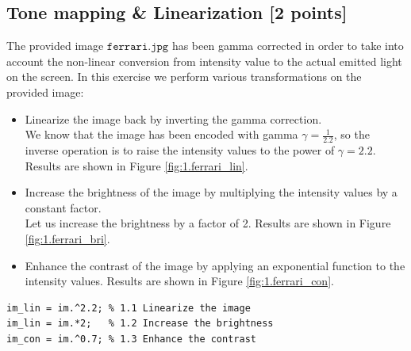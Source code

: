 \documentclass[tikz,14pt,fleqn]{article}
\begin{document}
\subsection{Tone mapping \& Linearization [2 points]}
 The provided image $\texttt{ferrari.jpg}$ has been gamma corrected in order to take into account the non-linear conversion from intensity value to the actual emitted light on the screen.
In this exercise we perform various transformations on the provided image:
 \begin{itemize}
    \item Linearize the image back by inverting the gamma correction.\\
    We know that the image has been encoded with gamma $\gamma = \frac{1}{2.2}$, so the inverse operation is to raise the intensity values to the power of $\gamma = 2.2$. Results are shown in Figure \ref{fig:1.ferrari_lin}.
    \item Increase the brightness of the image by multiplying the intensity values by a constant factor.\\
    Let us increase the brightness by a factor of 2. Results are shown in Figure \ref{fig:1.ferrari_bri}.
    \item Enhance the contrast of the image by applying an exponential function to the intensity values. Results are shown in Figure \ref{fig:1.ferrari_con}.
 \end{itemize}
 \begin{verbatim} 
im_lin = im.^2.2; % 1.1 Linearize the image
im_lin = im.*2;   % 1.2 Increase the brightness
im_con = im.^0.7; % 1.3 Enhance the contrast
\end{verbatim}
\end{document}
